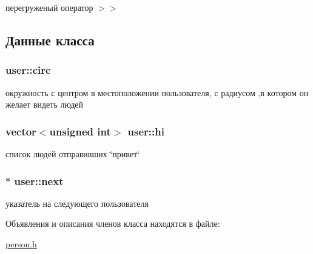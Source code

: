 перегруженый оператор $>$$>$ 



\subsection{Данные класса}
\hypertarget{classuser_aa3c75aaac5c22cc183ddf6da3c1a0a5e}{
\subsubsection[{circ}]{ user\-::circ}}\label{classuser_aa3c75aaac5c22cc183ddf6da3c1a0a5e}
окружность с центром в местоположении пользователя, с радиусом ,в котором он желает видеть людей \hypertarget{classuser_a3818c768915004dd7263312cd5253bbd}{
\subsubsection[{hi}]{\setlength{\rightskip}{0pt plus 5cm}vector$<$unsigned int$>$ user\-::hi}}\label{classuser_a3818c768915004dd7263312cd5253bbd}
список людей отправивших \char`\"{}привет\char`\"{} \hypertarget{classuser_aea47cda4229402a71223b4c5619fae97}{
\subsubsection[{next}]{$\ast$ user\-::next}}\label{classuser_aea47cda4229402a71223b4c5619fae97}


указатель на следующего пользователя 



Объявления и описания членов класса находятся в файле\-:\begin{DoxyCompactItemize}
\item 
\hyperlink{person_8h}{person.\-h}\end{DoxyCompactItemize}
